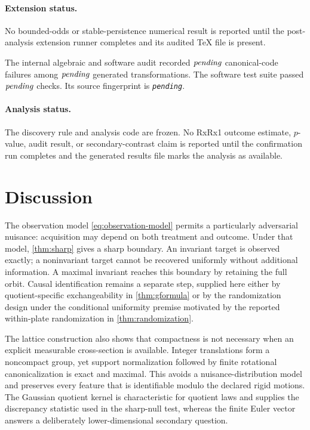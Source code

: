 \documentclass[11pt]{article}
\theoremstyle{definition}
\theoremstyle{remark}
\newcommand{\1}{\mathbf 1}
\newcommand{\pending}{\textnormal{\textit{pending}}}
\providecommand{\SoftwareCommit}{\pending}
\providecommand{\SoftwareTestsPassed}{\pending}
\providecommand{\RxInvariantAuditTrials}{\pending}
\providecommand{\RxInvariantAuditFailures}{\pending}
\begin{document}
\paragraph{Extension status.}
No bounded-odds or stable-persistence numerical result is reported until the
post-analysis extension runner completes and its audited TeX file is present.
\fi

The internal algebraic and software audit recorded
\(\RxInvariantAuditFailures\) canonical-code failures among
\(\RxInvariantAuditTrials\) generated transformations.  The software test suite
passed \(\SoftwareTestsPassed\) checks.  Its source fingerprint is
\texttt{\SoftwareCommit}.
\else
\paragraph{Analysis status.}
The discovery rule and analysis code are frozen.  No RxRx1 outcome estimate,
\(p\)-value, audit result, or secondary-contrast claim is reported until the
confirmation run completes and the generated results file marks the analysis
as available.
\fi

\FloatBarrier
\section{Discussion}

The observation model \eqref{eq:observation-model} permits a particularly
adversarial nuisance: acquisition may depend on both treatment and outcome.
Under that model, \cref{thm:sharp} gives a sharp boundary.  An invariant target
is observed exactly; a noninvariant target cannot be recovered uniformly
without additional information.  A maximal invariant reaches this boundary by
retaining the full orbit.  Causal identification remains a separate step,
supplied here either by quotient-specific exchangeability in
\cref{thm:gformula} or by the randomization design under the conditional
uniformity premise motivated by the reported within-plate randomization in
\cref{thm:randomization}.

The lattice construction also shows that compactness is not necessary when an
explicit measurable cross-section is available.  Integer translations form a
noncompact group, yet support normalization followed by finite rotational
canonicalization is exact and maximal.  This avoids a nuisance-distribution
model and preserves every feature that is identifiable modulo the declared
rigid motions.  The Gaussian quotient kernel is characteristic for quotient
laws and supplies the discrepancy statistic used in the sharp-null test,
whereas the finite Euler vector answers a deliberately lower-dimensional
secondary question.
\end{document}
